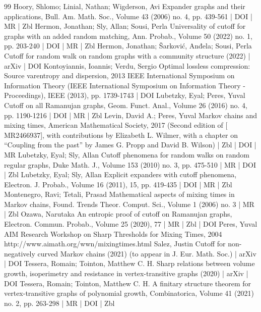 \documentclass[10pt]{amsart}
\theoremstyle{definition}\newtheorem{defi}[theo]{Definition}\newtheorem{rema}[theo]{Remark}\newtheorem{exam}[theo]{Example}\newtheorem{exem}[theo]{Example}\newtheorem{nota}[theo]{Notation}
\begin{document}
\begin{thebibliography}{99}
 Hoory, Shlomo; Linial, Nathan; Wigderson, Avi Expander graphs and their applications, Bull. Am. Math. Soc., Volume 43 (2006) no. 4, pp. 439-561 | DOI | MR | Zbl
 Hermon, Jonathan; Sly, Allan; Sousi, Perla Universality of cutoff for graphs with an added random matching, Ann. Probab., Volume 50 (2022) no. 1, pp. 203-240 | DOI | MR | Zbl
 Hermon, Jonathan; Šarković, Anđela; Sousi, Perla Cutoff for random walk on random graphs with a community structure (2022) | arXiv | DOI
 Kontoyiannis, Ioannis; Verdu, Sergio Optimal lossless compression: Source varentropy and dispersion, 2013 IEEE International Symposium on Information Theory (IEEE International Symposium on Information Theory - Proceedings), IEEE (2013), pp. 1739-1743 | DOI
 Lubetzky, Eyal; Peres, Yuval Cutoff on all Ramanujan graphs, Geom. Funct. Anal., Volume 26 (2016) no. 4, pp. 1190-1216 | DOI | MR | Zbl
 Levin, David A.; Peres, Yuval Markov chains and mixing times, American Mathematical Society, 2017 (Second edition of [ MR2466937], with contributions by Elizabeth L. Wilmer, with a chapter on “Coupling from the past” by James G. Propp and David B. Wilson) | Zbl | DOI | MR
 Lubetzky, Eyal; Sly, Allan Cutoff phenomena for random walks on random regular graphs, Duke Math. J., Volume 153 (2010) no. 3, pp. 475-510 | MR | DOI | Zbl
 Lubetzky, Eyal; Sly, Allan Explicit expanders with cutoff phenomena, Electron. J. Probab., Volume 16 (2011), 15, pp. 419-435 | DOI | MR | Zbl
 Montenegro, Ravi; Tetali, Prasad Mathematical aspects of mixing times in Markov chains, Found. Trends Theor. Comput. Sci., Volume 1 (2006) no. 3 | MR | Zbl
 Ozawa, Narutaka An entropic proof of cutoff on Ramanujan graphs, Electron. Commun. Probab., Volume 25 (2020), 77 | MR | Zbl | DOI
 Peres, Yuval AIM Research Workshop on Sharp Thresholds for Mixing Times, 2004 http://www.aimath.org/wwn/mixingtimes.html
 Salez, Justin Cutoff for non-negatively curved Markov chains (2021) (to appear in J. Eur. Math. Soc.) | arXiv | DOI
 Tessera, Romain; Tointon, Matthew C. H. Sharp relations between volume growth, isoperimetry and resistance in vertex-transitive graphs (2020) | arXiv | DOI
 Tessera, Romain; Tointon, Matthew C. H. A finitary structure theorem for vertex-transitive graphs of polynomial growth, Combinatorica, Volume 41 (2021) no. 2, pp. 263-298 | MR | DOI | Zbl
\end{thebibliography}
\end{document}
